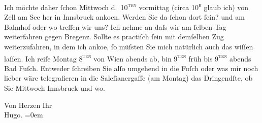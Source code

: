 \pstart
           {\pb}Ich möchte daher ſchon
                  Mittwoch d. 10\textsc{\textsuperscript{ten}} vormittag (circa 10\textsc{\textsuperscript{h}} glaub ich) von Zell am See her in Innsbruck anko{\geminationm}en.
               Werden Sie da ſchon dort ſein? und am Bahnhof oder wo treffen wir uns? Ich nehme an daſs wir am
               ſelben Tag weiterfahren gegen Bregenz. Sollte
               es practiſch ſein mit demſelben {\pb}Zug weiterzufahren, in dem ich anko{\geminationm}e, ſo müſsten Sie
               mich natürlich auch das wiſſen laſſen. Ich reiſe Montag 8\textsc{\textsuperscript{ten}} von Wien abends ab, bin 9\textsc{\textsuperscript{ten}}{ }früh bis 9\textsc{\textsuperscript{ten}}{ }abends{ }Bad Fuſch. Entweder ſchreiben Sie alſo umgehend
               in die Fuſch oder was mir noch lieber wäre {\pb}telegrafieren in die Saleſianergaſſe (am Montag) das
               Dringendſte, ob Sie Mittwoch{ }Innsbruck und wo.\pend
           
\pstart
           Von Herzen Ihr{\\[\baselineskip]}\spacefill\mbox{Hugo.}\pend
           \leftskip=0em{}\endnumbering{}  
      